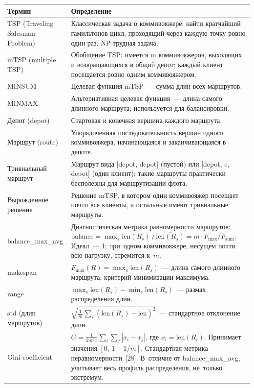 \documentclass[a4paper,14pt]{extreport}
\begin{document}
\begin{longtable}{|L{4.6cm}|L{9.9cm}|}
\hline
\textbf{Термин} & \textbf{Определение} \\
\hline
TSP (Traveling Salesman Problem) & Классическая задача о коммивояжере: найти кратчайший гамильтонов цикл, проходящий через каждую точку ровно один раз. NP-трудная задача. \\
\hline
mTSP (multiple TSP) & Обобщение TSP: имеется m коммивояжеров, выходящих и возвращающихся в общий депот; каждый клиент посещается ровно одним коммивояжером. \\
\hline
MINSUM & Целевая функция mTSP~--- сумма длин всех маршрутов. \\
\hline
MINMAX & Альтернативная целевая функция~--- длина самого длинного маршрута; используется для балансировки. \\
\hline
Депот (depot) & Стартовая и конечная вершина каждого маршрута. \\
\hline
Маршрут (route) & Упорядоченная последовательность вершин одного коммивояжера, начинающаяся и заканчивающаяся в депоте. \\
\hline
Тривиальный маршрут & Маршрут вида [depot, depot] (пустой) или [depot, c, depot] (один клиент); такие маршруты практически бесполезны для маршрутизации флота. \\
\hline
Вырожденное решение & Решение mTSP, в котором один коммивояжер посещает почти все клиенты, а остальные имеют тривиальные маршруты. \\
\hline
balance\_max\_avg & Диагностическая метрика равномерности маршрутов: $\mathrm{balance} = \max_s \mathrm{len}(R_s) \,/\, \overline{\mathrm{len}(R_s)} = m \cdot F_{\max}/F_{\mathrm{sum}}$. Идеал~--- 1; при~одном коммивояжере, несущем почти всю нагрузку, стремится к~$m$. \\
\hline
makespan & $F_{\max}(R) = \max_s \mathrm{len}(R_s)$~--- длина самого длинного маршрута; критерий минимизации максимума. \\
\hline
range & $\max_s \mathrm{len}(R_s) - \min_s \mathrm{len}(R_s)$~--- размах распределения длин. \\
\hline
std (длин маршрутов) & $\sqrt{\frac{1}{m} \sum_s (\mathrm{len}(R_s) - \overline{\mathrm{len}})^2}$~--- стандартное отклонение длин. \\
\hline
Gini coefficient & $G = \frac{1}{2m^2 \overline{x}} \sum_i \sum_j |x_i - x_j|$, где $x_i = \mathrm{len}(R_i)$. Принимает значения $[0,\,1{-}1/m]$. Стандартная метрика неравномерности~[28]. В~отличие от balance\_max\_avg, учитывает весь профиль распределения, не~только экстремум. \\

\end{longtable}
\end{document}

